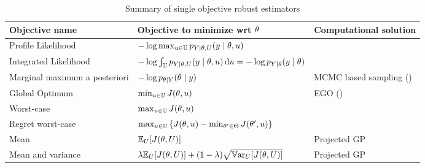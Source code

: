 \documentclass[../../Main_ManuscritThese.tex]{subfiles}
\begin{document}


  


\begin{table}[ht]
  \centering
  \begin{tabular}{lll}
    \toprule
    Objective name & Objective to minimize wrt $\theta$  & Computational solution \\ \midrule
    Profile Likelihood & $-\log \max_{u \in \mathbb{U}} p_{Y \mid \theta, U}(y \mid \theta, u)$  \\
    Integrated Likelihood & $-\log \int_{\mathbb{U}} p_{Y \mid \theta, U}(y \mid \theta, u) \,\mathrm{d}u=-\log p_{Y\mid \theta}(y\mid \theta)$ \\
    Marginal maximum a posteriori & $-\log p_{\theta\mid Y}(\theta \mid y)$  & MCMC based sampling (\cite{doucet_marginal_2002})\\ \midrule
    Global Optimum & $\min_{u\in\mathbb{U}} J(\theta, u)$ & EGO (\cite{jones_efficient_1998})\\
    Worst-case & $\max_{u \in \mathbb{U}} J(\theta, u)$ \\
    Regret worst-case & $\max_{u\in\mathbb{U}}\left\{J(\theta, u) - \min_{\theta^{\prime}\in\Theta} J(\theta^{\prime}, u)\right\}$ \\ \midrule
    Mean & $\mathbb{E}_{U}[J(\theta, U)]$ & Projected GP \\
    Mean and variance & $ \lambda \mathbb{E}_{U}[J(\theta, U)] + (1-\lambda) \sqrt{\mathbb{V}\mathrm{ar}_{U}[J(\theta, U)]}$ & Projected GP \\ \bottomrule
  \end{tabular}
  \caption{Summary of single objective robust estimators}
\end{table}



\subfileLocal{
	\pagestyle{empty}
	
	
}
\end{document}
